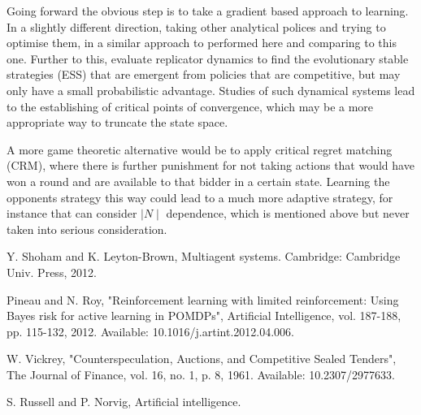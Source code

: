 \documentclass[10pt,conference,twocolumn]{IEEEtran}
\begin{document}
Going forward the obvious step is to take a gradient based approach to learning. In a slightly different direction, taking other analytical polices and trying to optimise them, in a similar approach to performed here and comparing to this one. Further to this, evaluate replicator dynamics to find the evolutionary stable strategies (ESS) that are emergent from policies that are competitive, but may only have a small probabilistic advantage. Studies of such dynamical systems lead to the establishing of critical points of convergence, which may be a more appropriate way to truncate the state space.

A more game theoretic alternative would be to apply critical regret matching (CRM), where there is further punishment for not taking actions that would have won a round and are available to that bidder in a certain state. Learning the opponents strategy this way could lead to a much more adaptive strategy, for instance that can consider $\mid N \mid$ dependence, which is mentioned above but never taken into serious consideration.

\begin{thebibliography}{9}

Y. Shoham and K. Leyton-Brown, Multiagent systems. Cambridge: Cambridge Univ. Press, 2012.

Pineau and N. Roy, "Reinforcement learning with limited reinforcement: Using Bayes risk for active learning in POMDPs", Artificial Intelligence, vol. 187-188, pp. 115-132, 2012. Available: 10.1016/j.artint.2012.04.006.

W. Vickrey, "Counterspeculation, Auctions, and Competitive Sealed Tenders", The Journal of Finance, vol. 16, no. 1, p. 8, 1961. Available: 10.2307/2977633.

S. Russell and P. Norvig, Artificial intelligence.

\end{thebibliography}

\end{document}
